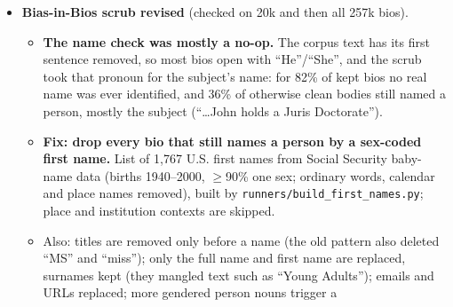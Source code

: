 \documentclass{article}
\begin{document}
\begin{itemize}
\begin{itemize}
                The proxy now measures \emph{parenthood} while the explicit clause states \emph{parental
                leave}; the labels say which.
          \item \textbf{Plausibility rules} drop bios whose content contradicts a stated age of 30
                (a year before 2014, $>$8 years of experience, ``two decades'', retirement):
                94{,}226 scrubbed bios leave 59{,}838, far more than the $\approx$4{,}000 sampled.
          \item \emph{[Corrected 2026-09-23: this was not actually done until then --- the hiring dataset
                still split ungrouped.]} Hiring pairs are now grouped by biography in the probe/eval split (as credit), which also
                closes the leak flagged for this domain; \texttt{generate\_bios.py} takes
                \texttt{--n-bios} instead of \texttt{--n-per} and writes \texttt{cells.jsonl}.
          \item Education keeps its single-axis design (its ``grade level'' axis is itself an age cue;
                a factorial there needs its own design discussion).
        \end{itemize}
  \item \textbf{Bias-in-Bios scrub revised} (checked on 20k and then all 257k bios).
        \begin{itemize}
          \item \textbf{The name check was mostly a no-op.} The corpus text has its first sentence removed,
                so most bios open with ``He''/``She'', and the scrub took that pronoun for the subject's
                name: for 82\% of kept bios no real name was ever identified, and 36\% of otherwise clean
                bodies still named a person, mostly the subject (``\dots John holds a Juris Doctorate'').
          \item \textbf{Fix: drop every bio that still names a person by a sex-coded first name.} List of
                1{,}767 U.S. first names from Social Security baby-name data (births 1940--2000, $\geq$90\%
                one sex; ordinary words, calendar and place names removed), built by
                \texttt{runners/build\_first\_names.py}; place and institution contexts are skipped.
          \item Also: titles are removed only before a name (the old pattern also deleted ``MS'' and
                ``miss''); only the full name and first name are replaced, surnames kept (they mangled text
                such as ``Young Adults''); emails and URLs replaced; more gendered person nouns trigger a

\end{itemize}
\end{itemize}
\end{document}
